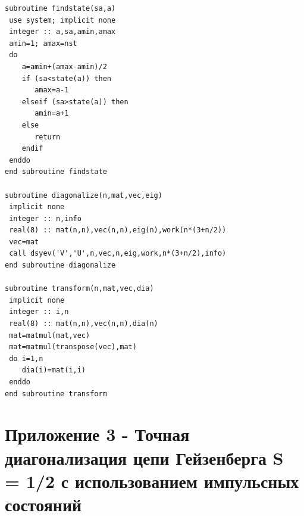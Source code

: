 \documentclass[11pt]{article}
\begin{document}
\begin{lstlisting}
subroutine findstate(sa,a)
 use system; implicit none
 integer :: a,sa,amin,amax
 amin=1; amax=nst
 do 
    a=amin+(amax-amin)/2
    if (sa<state(a)) then
       amax=a-1
    elseif (sa>state(a)) then
       amin=a+1
    else
       return
    endif
 enddo
end subroutine findstate

subroutine diagonalize(n,mat,vec,eig)
 implicit none
 integer :: n,info
 real(8) :: mat(n,n),vec(n,n),eig(n),work(n*(3+n/2))
 vec=mat
 call dsyev('V','U',n,vec,n,eig,work,n*(3+n/2),info)
end subroutine diagonalize

subroutine transform(n,mat,vec,dia)
 implicit none
 integer :: i,n
 real(8) :: mat(n,n),vec(n,n),dia(n)
 mat=matmul(mat,vec)
 mat=matmul(transpose(vec),mat)
 do i=1,n
    dia(i)=mat(i,i)
 enddo
end subroutine transform
\end{lstlisting}

\section{Приложение 3 - Точная диагонализация цепи Гейзенберга S = 1/2 с использованием импульсных состояний}
\end{document}
